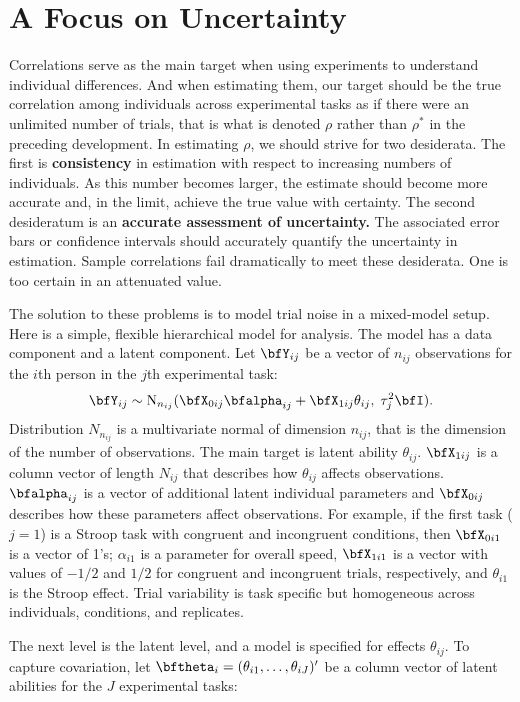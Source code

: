 \documentclass[
  ,man]{apa6}
\begin{document}
\section{A Focus on Uncertainty}\label{a-focus-on-uncertainty}

Correlations serve as the main target when using experiments to understand individual differences. And when estimating them, our target should be the true correlation among individuals across experimental tasks as if there were an unlimited number of trials, that is what is denoted \(\rho\) rather than \(\rho^*\) in the preceding development. In estimating \(\rho\), we should strive for two desiderata. The first is \textbf{consistency} in estimation with respect to increasing numbers of individuals. As this number becomes larger, the estimate should become more accurate and, in the limit, achieve the true value with certainty. The second desideratum is an \textbf{accurate assessment of uncertainty.} The associated error bars or confidence intervals should accurately quantify the uncertainty in estimation. Sample correlations fail dramatically to meet these desiderata. One is too certain in an attenuated value.

The solution to these problems is to model trial noise in a mixed-model setup. Here is a simple, flexible hierarchical model for analysis. The model has a data component and a latent component. Let \(\bfY_{ij}\) be a vector of \(n_{ij}\) observations for the \(i\)th person in the \(j\)th experimental task:
\[
\bfY_{ij} \sim \mbox{N}_{n_{ij}}(\bfX_{0ij}\bfalpha_{ij}+\bfX_{1ij}\theta_{ij},\;\tau_j^2\bfI).
\]
Distribution \(N_{n_{ij}}\) is a multivariate normal of dimension \(n_{ij}\), that is the dimension of the number of observations. The main target is latent ability \(\theta_{ij}\). \(\bfX_{1ij}\) is a column vector of length \(N_{ij}\) that describes how \(\theta_{ij}\) affects observations. \(\bfalpha_{ij}\) is a vector of additional latent individual parameters and \(\bfX_{0ij}\) describes how these parameters affect observations. For example, if the first task (\(j=1\)) is a Stroop task with congruent and incongruent conditions, then \(\bfX_{0i1}\) is a vector of 1's; \(\alpha_{i1}\) is a parameter for overall speed, \(\bfX_{1i1}\) is a vector with values of \(-1/2\) and \(1/2\) for congruent and incongruent trials, respectively, and \(\theta_{i1}\) is the Stroop effect. Trial variability is task specific but homogeneous across individuals, conditions, and replicates.

The next level is the latent level, and a model is specified for effects \(\theta_{ij}\). To capture covariation, let \(\bftheta_i=(\theta_{i1},\ldots,\theta_{iJ})'\) be a column vector of latent abilities for the \(J\) experimental tasks:
\end{document}
